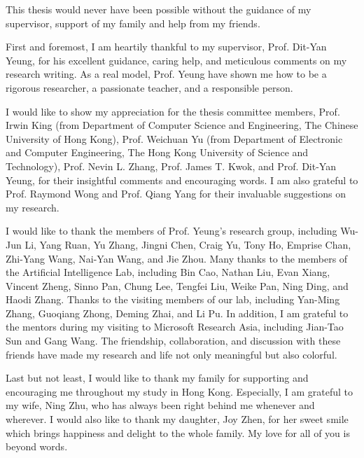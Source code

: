 \acknowledgments

This thesis would never have been possible without the guidance of my supervisor, support of my family and help from my friends.

First and foremost, I am heartily thankful to  my supervisor, Prof. Dit-Yan Yeung, for his excellent guidance, caring help, and meticulous comments on my research writing. As a real model, Prof. Yeung have shown me how to be a rigorous researcher, a passionate teacher, and a responsible person. %

I would like to show my appreciation for the thesis committee members, Prof. Irwin King (from Department of Computer Science and Engineering, The Chinese University of Hong Kong), Prof. Weichuan Yu (from Department of Electronic and Computer Engineering, The Hong Kong University of Science and Technology), Prof. Nevin L. Zhang, Prof. James T. Kwok, and Prof. Dit-Yan Yeung, for their insightful comments and encouraging words. I am also grateful to Prof. Raymond Wong and Prof. Qiang Yang for their invaluable suggestions on my research.

I would like to thank the members of Prof. Yeung's research group, including Wu-Jun Li, Yang Ruan, Yu Zhang, Jingni Chen, Craig Yu, Tony Ho, Emprise Chan, Zhi-Yang Wang, Nai-Yan Wang, and Jie Zhou. Many thanks to the members of the Artificial Intelligence Lab, including Bin Cao, Nathan Liu, Evan Xiang, Vincent Zheng, Sinno Pan, Chung Lee, Tengfei Liu, Weike Pan, Ning Ding, and Haodi Zhang. Thanks to the visiting members of our lab, including Yan-Ming Zhang, Guoqiang Zhong, Deming Zhai, and Li Pu. In addition, I am grateful to the mentors during my visiting to Microsoft Research Asia, including Jian-Tao Sun and Gang Wang. The friendship, collaboration, and discussion with these friends have made my research and life not only meaningful but also colorful.


Last but not least, I would like to thank my family for supporting and encouraging me throughout my study in Hong Kong. Especially, I am grateful to my wife, Ning Zhu, who has always been right behind me whenever and wherever. I would also like to thank my daughter, Joy Zhen, for her sweet smile which brings happiness and delight to the whole family. My love for all of you is beyond words. 

\endacknowledgments

